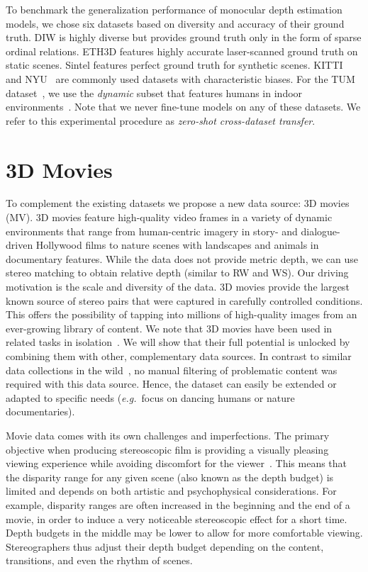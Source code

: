  To benchmark the generalization performance of monocular depth estimation models, we chose six datasets based on diversity and accuracy of their ground truth. DIW \cite{Chen2016} is highly diverse but provides ground truth only in the form of sparse ordinal relations. ETH3D \cite{Schoeps2017} features highly accurate laser-scanned ground truth on static scenes. Sintel \cite{Butler2012} features perfect ground truth for synthetic scenes. KITTI~\cite{MenzeGeiger2015} and NYU~\cite{Silberman2012} are commonly used datasets with characteristic biases. For the TUM dataset~\cite{Sturm2012}, we use the \textit{dynamic} subset that features humans in indoor environments~\cite{Li2019}. Note that we never fine-tune models on any of these datasets. We refer to this experimental procedure as \emph{zero-shot
  cross-dataset transfer}.

\section{3D Movies}
\label{sec:movies}

To complement the existing datasets we propose a new data source: 3D movies (MV). 3D movies feature high-quality video frames in a variety of dynamic environments that range from human-centric imagery in story- and dialogue-driven Hollywood films to nature scenes with landscapes and animals in documentary features. While the data does not provide metric depth, we can use stereo matching to obtain relative depth (similar to RW and WS). Our driving motivation is the scale and diversity of the data. 3D movies provide the largest known source of stereo pairs that were captured in carefully controlled conditions. This offers the possibility of tapping into millions of high-quality images from an ever-growing library of content. We note that 3D movies have been used in related tasks in isolation~\cite{Hadfield2017,Xie2016}. We will show that their full potential is unlocked by combining them with other, complementary data sources. In contrast to similar data collections in the wild~\cite{Xian2018,Wang2019,Li2019}, no manual filtering of problematic content was required with this data source. Hence, the dataset can easily be extended or adapted to specific needs (\MakeLowercase{\textit{e.g.}}\ focus on dancing humans or nature documentaries).

Movie data comes with its own challenges and imperfections. The primary objective when producing stereoscopic film is providing a visually pleasing viewing experience while avoiding discomfort for the viewer~\cite{DevernayBeardsley2010}. This means that the disparity range for any given scene (also known as the depth budget) is limited and depends on both artistic and psychophysical considerations. For example, disparity ranges are often increased in the beginning and the end of a movie, in order to induce a very noticeable stereoscopic effect for a short time. Depth budgets in the middle may be lower to allow for more comfortable viewing. Stereographers thus adjust their depth budget depending on the content, transitions, and even the rhythm of scenes.

